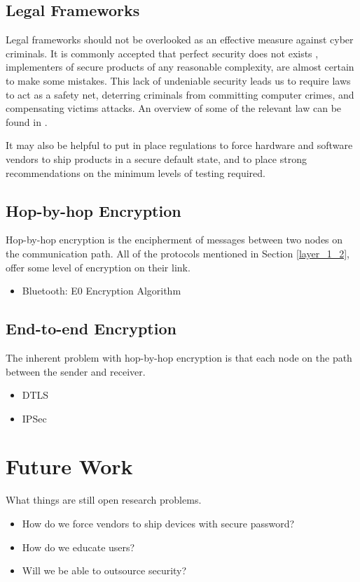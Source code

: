 \documentclass[12pt,journal,compsoc]{IEEEtran}
\begin{document}
\subsection{Legal Frameworks}
Legal frameworks should not be overlooked as an effective measure against cyber
criminals. It is commonly accepted that perfect security does not exists
\cite{ThereMustBeA}, implementers of secure products of any reasonable
complexity, are almost certain to make some mistakes. This lack of undeniable
security leads us to require laws to act as a safety net, deterring criminals
from committing computer crimes, and compensating victims attacks. An overview
of some of the relevant law can be found in \cite{Weber2010}. 

It may also be helpful to put in place regulations to force hardware and
software vendors to ship products in a secure default state, and to place
strong recommendations on the minimum levels of testing required. 

\subsection{Hop-by-hop Encryption}
Hop-by-hop encryption is the encipherment of messages between two nodes on the
communication path. All of the  protocols mentioned in Section \ref{layer_1_2}, offer
some level of encryption on their link. 

\begin{itemize}
\item Bluetooth: E0 Encryption Algorithm
\end{itemize}

\subsection{End-to-end Encryption}
The inherent problem with hop-by-hop encryption is that each node on the path between the sender and receiver.   

\begin{itemize}
\item DTLS
\item IPSec
\end{itemize}


\section{Future Work}
What things are still open research problems. 

\begin{itemize}
\item How do we force vendors to ship devices with secure password?
\item How do we educate users?
\item Will we be able to outsource security?
\end{itemize}
\end{document}
